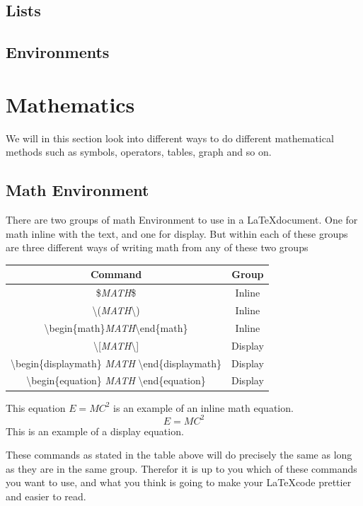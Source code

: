 \documentclass{article}
\newcommand{\bs}[1]{\textbackslash{}#1} %
\begin{document}
\subsection{Lists}

\subsection{Environments}
\newpage

\section{Mathematics}
We will in this section look into different ways to do different mathematical methods such as symbols, operators, tables, graph and so on.

\subsection{Math Environment}
There are two groups of math Environment to use in a \LaTeX document. One for math inline with the text, and one for display.
But within each of these groups are three different ways of writing math from any of these two groups

\begin{table}[h]
    \centering
    \begin{tabular}{|c|c|} \hline
        \rowcolor{gray!30}
        Command & Group \\ \hline
        \$\textit{MATH}\$ & Inline \\ \hline
        \bs{(}\textit{MATH}\bs{)} & Inline \\ \hline
        \bs{begin\{math\}}\textit{MATH}\bs{end\{math\}} & Inline \\ \hline
        \bs{[\textit{MATH}}\bs{]} & Display \\ \hline
        \bs{begin\{displaymath\}} \textit{MATH} \bs{end\{displaymath\}} & Display \\ \hline
        \bs{begin\{equation\}} \textit{MATH} \bs{end\{equation\}} & Display \\ \hline
    \end{tabular}
    \label{tab:math_simple_operators}
\end{table}
This equation $E=MC^2$ is an example of an inline math equation.
\[E=MC^2\]
This is an example of a display equation.

These commands as stated in the table above will do precisely the same as long as they are in the same group. Therefor it is up to you which of these commands
you want to use, and what you think is going to make your \LaTeX code prettier and easier to read. \\
\end{document}
